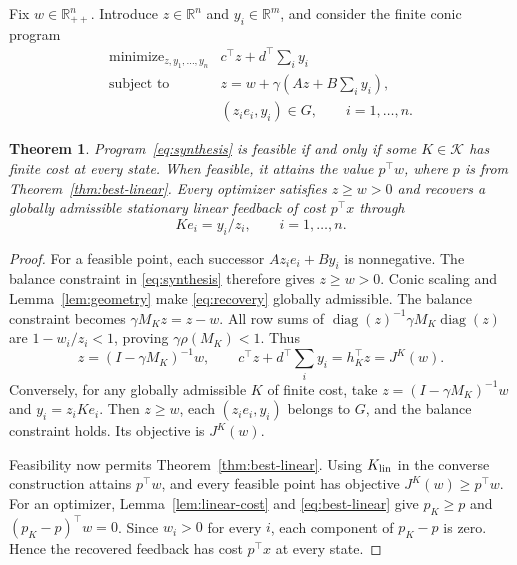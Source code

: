 \documentclass[10pt]{article}
\newtheorem{theorem}{Theorem}
\newcommand{\R}{\mathbb R}
\DeclareMathOperator{\diag}{diag}
\begin{document}
Fix $w\in\R_{++}^n$. Introduce $z\in\R^n$ and $y_i\in\R^m$, and consider the finite conic program
\begin{equation}
 \begin{array}{ll}
 \operatorname{minimize}_{z,y_1,\ldots,y_n}
     &c^\top z+d^\top\displaystyle\sum_i y_i\\[1mm]
 \operatorname{subject\ to}
     &z=w+\gamma\left(Az+B\displaystyle\sum_i y_i\right),\\
     &(z_i e_i,y_i)\in G,\qquad i=1,\ldots,n.
 \end{array}
 \label{eq:synthesis}
\end{equation}

\begin{theorem}
\label{thm:synthesis}
Program~\eqref{eq:synthesis} is feasible if and only if some $K\in\mathcal K$ has finite cost at every state. When feasible, it attains the value $p^\top w$, where $p$ is from Theorem~\ref{thm:best-linear}. Every optimizer satisfies $z\ge w>0$ and recovers a globally admissible stationary linear feedback of cost $p^\top x$ through
\begin{equation}
 Ke_i=y_i/z_i,\qquad i=1,\ldots,n.
 \label{eq:recovery}
\end{equation}
\end{theorem}
\begin{proof}
For a feasible point, each successor $Az_i e_i+By_i$ is nonnegative. The balance constraint in \eqref{eq:synthesis} therefore gives $z\ge w>0$. Conic scaling and Lemma~\ref{lem:geometry} make \eqref{eq:recovery} globally admissible. The balance constraint becomes $\gamma M_Kz=z-w$. All row sums of $\diag(z)^{-1}\gamma M_K\diag(z)$ are $1-w_i/z_i<1$, proving $\gamma\rho(M_K)<1$. Thus
\[
 z=(I-\gamma M_K)^{-1}w,\qquad
 c^\top z+d^\top\sum_i y_i=h_K^\top z=J^K(w).
\]
Conversely, for any globally admissible $K$ of finite cost, take $z=(I-\gamma M_K)^{-1}w$ and $y_i=z_iKe_i$. Then $z\ge w$, each $(z_i e_i,y_i)$ belongs to $G$, and the balance constraint holds. Its objective is $J^K(w)$.

Feasibility now permits Theorem~\ref{thm:best-linear}. Using $K_{\rm lin}$ in the converse construction attains $p^\top w$, and every feasible point has objective $J^K(w)\ge p^\top w$. For an optimizer, Lemma~\ref{lem:linear-cost} and \eqref{eq:best-linear} give $p_K\ge p$ and $(p_K-p)^\top w=0$. Since $w_i>0$ for every $i$, each component of $p_K-p$ is zero. Hence the recovered feedback has cost $p^\top x$ at every state.
\end{proof}
\end{document}
